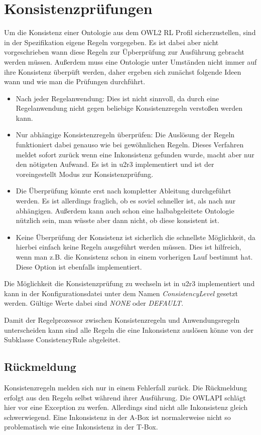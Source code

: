 \section{Konsistenzprüfungen}
Um die Konsistenz einer Ontologie aus dem OWL2 RL Profil sicherzustellen, sind in der Spezifikation eigene Regeln vorgegeben. Es ist dabei aber nicht vorgeschrieben wann diese Regeln zur Üpberprüfung zur Ausführung gebracht werden müssen. Außerdem muss eine Ontologie unter Umständen nicht immer auf ihre Konsistenz überpüft werden, daher ergeben sich zunächst folgende Ideen wann und wie man die Prüfungen durchführt.

\begin{itemize}
  \item Nach jeder Regelanwendung: Dies ist nicht sinnvoll, da durch eine Regelanwendung nicht gegen beliebige Konsistenzregeln verstoßen werden kann.
  \item Nur abhängige Konsistenzregeln überprüfen: Die Auslösung der Regeln funktioniert dabei genauso wie bei gewöhnlichen Regeln. Dieses Verfahren meldet sofort zurück wenn eine Inkonsistenz gefunden wurde, macht aber nur den nötigsten Aufwand. Es ist in u2r3 implementiert und ist der voreingestellt Modus zur Konsistenzprüfung.
  \item Die Überprüfung könnte erst nach kompletter Ableitung durchgeführt werden. Es ist allerdings fraglich, ob es soviel schneller ist, als nach nur abhängigen. Außerdem kann auch schon eine halbabgeleitete Ontologie nützlich sein, man wüsste aber dann nicht, ob diese konsistent ist.
  \item Keine Überprüfung der Konsistenz ist sicherlich die schnellste Möglichkeit, da hierbei einfach keine Regeln ausgeführt werden müssen. Dies ist hilfreich, wenn man z.B. die Konsistenz schon in einem vorherigen Lauf bestimmt hat. Diese Option ist ebenfalls implementiert.
\end{itemize} 
Die Möglichkeit die Konsistenzprüfung zu wechseln ist in u2r3 implementiert und kann in der Konfigurationsdatei unter dem Namen \emph{ConsistencyLevel} gesetzt werden. Gültige Werte dabei sind \emph{NONE} oder \emph{DEFAULT}.

Damit der Regelprozessor zwischen Konsistenzregeln und Anwendungsregeln unterscheiden kann sind alle Regeln die eine Inkonsistenz auslösen könne von der Subklasse ConsistencyRule abgeleitet.

\subsection{Rückmeldung}
Konsistenzregeln melden sich nur in einem Fehlerfall zurück. Die Rückmeldung erfolgt aus den Regeln selbst während ihrer Ausführung. Die OWLAPI schlägt hier vor eine Exception zu werfen. Allerdings sind nicht alle Inkonsistenz gleich schwerwiegend. Eine Inkonsistenz in der A-Box ist normalerweise nicht so problematisch wie eine Inkonsistenz in der T-Box.

